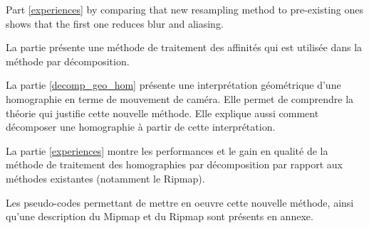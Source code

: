 	Part \ref{experiences} by comparing that new resampling method to pre-existing ones shows that the first one reduces blur and aliasing.
	
	
	
	



	La partie \label{szeliski_section} présente une méthode de traitement des affinités qui est utilisée dans la méthode par décomposition.

	La partie \ref{decomp_geo_hom} présente une interprétation géométrique d'une homographie en terme de mouvement de caméra. Elle permet de comprendre la théorie qui justifie cette nouvelle méthode. Elle explique aussi comment décomposer une homographie à partir de cette interprétation.

	La partie \ref{experiences} montre les performances et le gain en qualité de la méthode de traitement des homographies par décomposition par rapport aux méthodes existantes (notamment le Ripmap).

	Les pseudo-codes permettant de mettre en oeuvre cette nouvelle méthode, ainsi qu'une description du Mipmap et du Ripmap sont présents en annexe.
